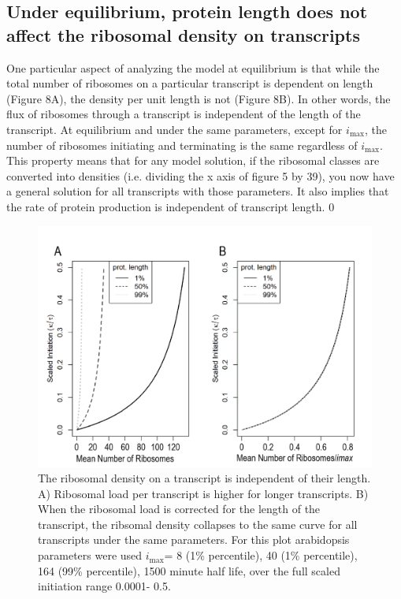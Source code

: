 \documentclass[review]{elsarticle}
\newcommand{\imax}{\ensuremath{i_{\max}}\xspace}
\begin{document}
\subsection{Under equilibrium, protein length does not affect the ribosomal density on transcripts}
One particular aspect of analyzing the model at equilibrium is that while the total number of ribosomes on a particular transcript is dependent on length (Figure 8A), the density per unit length is not (Figure 8B). In other words, the flux of ribosomes through a transcript is independent of the length of the transcript. At equilibrium and under the same parameters, except for \imax, the number of ribosomes initiating and terminating is the same regardless of \imax. This property means that for any model solution, if the ribosomal classes are converted into densities (i.e. dividing the x axis of figure 5 by 39), you now have a general solution for all transcripts with those parameters. It also implies that the rate of protein production is independent of transcript length. 0


\begin{figure}[!ht]
\centering
\includegraphics[width=120mm]{Images/2023-07-04_length_independence.png}
\caption{The ribosomal density on a transcript is independent of their length. A) Ribosomal load per transcript is higher for longer transcripts. B) When the ribosomal load is corrected for the length of the transcript, the ribsomal density collapses to the same curve for all transcripts under the same parameters. For this plot arabidopsis parameters were used \imax =  8 (1\% percentile),  40 (1\% percentile), 164 (99\% percentile), 1500 minute half life, over the full scaled initiation range 0.0001- 0.5.}
\end{figure}
\end{document}
